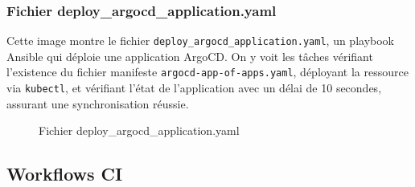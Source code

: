 \subsubsection{Fichier deploy\_argocd\_application.yaml}
Cette image montre le fichier \texttt{deploy\_argocd\_application.yaml}, un playbook Ansible qui déploie une application ArgoCD. On y voit les tâches vérifiant l’existence du fichier manifeste \texttt{argocd-app-of-apps.yaml}, déployant la ressource via \texttt{kubectl}, et vérifiant l’état de l’application avec un délai de 10 secondes, assurant une synchronisation réussie.
\newpage
\begin{figure}[h]
    \begin{adjustwidth}{-3.5cm}{-3.5cm}
    \centering
    \caption{Fichier deploy\_argocd\_application.yaml}
    \label{fig:ansible08}
    \end{adjustwidth}
\end{figure}

\subsection{Workflows CI}
